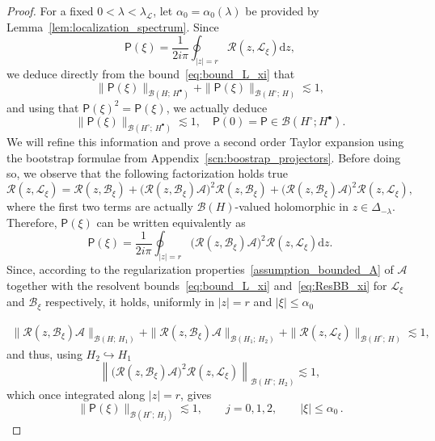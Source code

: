 \documentclass[AHL,Unicode,longabstracts,published]{cedram}
\renewcommand{\d}{\mathrm{d}}
\renewcommand{\AA}{\mathcal{A}}
\newcommand{\BB}{\mathcal{B}}
\newcommand{\LL}{\mathcal{L}}
\newcommand{\PP}{\mathsf{P}}
\newcommand{\RR}{\mathcal{R}}
\newcommand{\BBB}{\mathscr{B}}
\newcommand{\Ss}{H}
\newcommand{\Ssp}{H^{\bullet}}
\newcommand{\Ssm}{H^{\circ}}
\renewcommand*\le{\leqslant}
\begin{document}
\begin{proof}
For a fixed $0 < \lambda < \lambda_{\LL}$, let $\alpha_{0}=\alpha_{0}(\lambda)$ be provided by Lemma~\ref{lem:localization_spectrum}. Since
\[
\PP(\xi)=\frac{1}{2i\pi}\oint_{|z|=r}\RR(z,\LL_{\xi}) \d z,
\]
we deduce directly from the bound~\eqref{eq:bound_L_xi} that
\[
\| \PP(\xi) \|_{\BBB(\Ss ;\,\Ssp)} + \| \PP(\xi) \|_{\BBB(\Ssm ;\,\Ss)} \lesssim 1,
\]
and using that $\PP(\xi)^2 = \PP(\xi)$, we actually deduce
\begin{equation}\label{eq:reg_P_xi_order_0}
\| \PP(\xi) \|_{\BBB(\Ssm ;\,\Ssp)} \lesssim 1, \quad \PP(0) = \PP \in \BBB(\Ssm ; \Ssp).
\end{equation}
We will refine this information and prove a second order Taylor expansion using the bootstrap formulae from Appendix~\ref{scn:boostrap_projectors}. Before doing so, we observe that the following factorization holds true
\begin{equation*}
\RR(z,\LL_{\xi}) =\RR(z,\BB_{\xi})+ \big(\RR(z,\BB_{\xi}) \AA \big)^2 \RR(z,\BB_{\xi}) + \big(\RR(z,\BB_{\xi}) \AA \big)^2 \RR(z,\LL_{\xi}),
\end{equation*}
where the first two terms are actually $\BBB(\Ss)$-valued holomorphic in $z \in \Delta_{-\lambda}$. Therefore, $\PP(\xi)$ can be written equivalently as
\[
\PP(\xi)=\frac{1}{2i\pi}\oint_{|z|=r} \big(\RR(z,\BB_{\xi})\AA\big)^{2}\RR(z,\LL_{\xi})\d z.
\]
Since, according to the regularization properties~\eqref{assumption_bounded_A} of $\AA$ together with the resolvent bounds~\eqref{eq:bound_L_xi} and~\eqref{eq:ResBB_xi} for $\LL_\xi$ and $\BB_\xi$ respectively, it holds, uniformly in $|z|=r$ and $| \xi | \le \alpha_0$

\begin{align*}
\| \RR(z, \BB_\xi) \AA \|_{ \BBB(\Ss ;\,\Ss_1) } + \| \RR(z, \BB_\xi) \AA \|_{ \BBB(\Ss_1 ;\,\Ss_2) } + \| \RR(z, \LL_\xi) \|_{ \BBB(\Ssm ;\,\Ss)} \lesssim 1,
\end{align*}
and thus, using $\Ss_{2} \hookrightarrow \Ss_1$
\begin{equation*}
\left\| \big(\RR(z,\BB_{\xi})\AA\big)^{2}\RR(z,\LL_{\xi}) \right\|_{ \BBB(\Ssm ;\,\Ss_2)} \lesssim 1,
\end{equation*}
which once integrated along $| z | = r$, gives
\begin{equation}\label{eq:regularization_P_xi}
\| \PP(\xi) \|_{\BBB(\Ssm ;\,\Ss_{j})} \lesssim 1, \qquad j=0,1,2, \qquad | \xi | \le \alpha_0\,.
\end{equation}



\end{proof}
\end{document}
